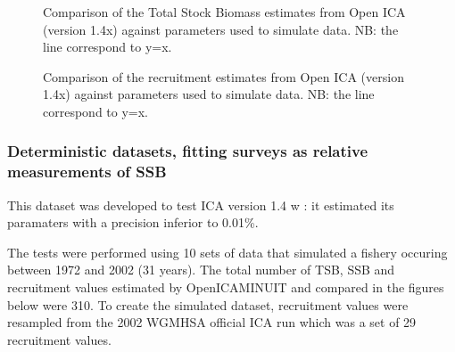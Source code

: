  \begin{figure}
  	\begin{center}
  	\end{center}
  	\caption{Comparison of the Total Stock Biomass estimates from Open ICA (version 1.4x) against parameters used to simulate data. NB: the line correspond to y=x.}
  \end{figure}

  \begin{figure}
  	\begin{center}
  	\end{center}
  	\caption{Comparison of the recruitment estimates from Open ICA (version 1.4x) against parameters used to simulate data. NB: the line correspond to y=x.}
  \end{figure}


\subsubsection{Deterministic datasets, fitting surveys as relative measurements of SSB}

This dataset was developed to test ICA version 1.4 w \citep{kieTR05}: it estimated its paramaters with a precision inferior to 0.01\%. 

The tests were performed using 10 sets of data that simulated a fishery occuring between 1972 and 2002 (31 years). The total number of TSB, SSB and recruitment values estimated by OpenICAMINUIT and compared in the figures below were 310. To create the simulated dataset, recruitment values were resampled from the 2002 WGMHSA official ICA run which was a set of 29 recruitment values.

